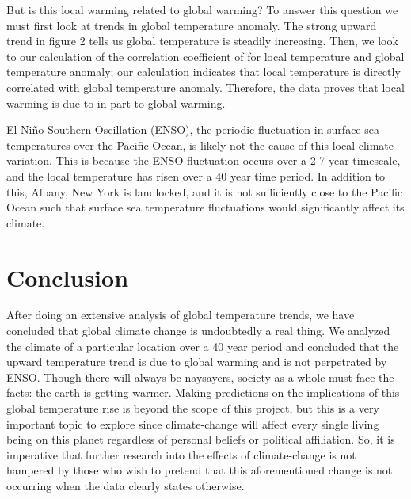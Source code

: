 \documentclass[12pt]{article}
\begin{document}
But is this local warming related to global warming?
To answer this question we must first look at trends in
global temperature anomaly.
The strong upward trend in figure 2 tells us global temperature is
steadily increasing.
Then, we look to our calculation of the correlation coefficient of
for local temperature and global temperature anomaly;
our calculation indicates that local temperature is directly
correlated with global temperature anomaly.
Therefore, the data proves that local warming is due to in part
to global warming.

El Ni\~{n}o-Southern Oscillation (ENSO), the periodic fluctuation in
surface sea temperatures over the Pacific Ocean, is likely not
the cause of this local climate variation.
This is because the ENSO fluctuation occurs over a 2-7 year timescale,
and the local temperature has risen over a 40 year time period.
In addition to this, Albany, New York is landlocked, and it is not
sufficiently close to the Pacific Ocean such that surface sea
temperature fluctuations would significantly affect its climate.

\section*{Conclusion}
After doing an extensive analysis of global temperature trends,
we have concluded that global climate change is undoubtedly a
real thing.
We analyzed the climate of a particular location over a
40 year period and concluded that the upward temperature trend
is due to global warming and is not perpetrated by ENSO.
Though there will always be naysayers, society as a whole must
face the facts: the earth is getting warmer.
Making predictions on the implications of this global
temperature rise is beyond the scope of this project, but this is
a very important topic to explore since climate-change will affect
every single living being on this planet regardless of
personal beliefs or political affiliation.
So, it is imperative that further research into the effects of
climate-change is not hampered by those who wish to pretend that
this aforementioned change is not occurring when the data
clearly states otherwise.
\end{document}
